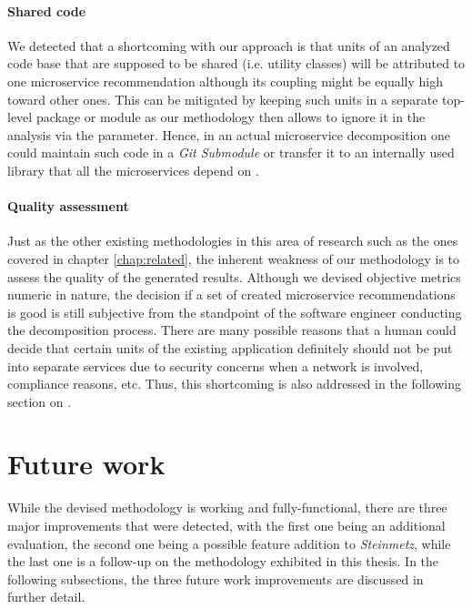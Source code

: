 \documentclass[12pt,a4paper]{report}
\begin{document}
\paragraph{Shared code}
We detected that a shortcoming with our approach is that units
of an analyzed code base that are supposed to be shared (i.e. utility classes)
will be attributed to one microservice recommendation although its coupling
might be equally high toward other ones. This can be mitigated by keeping
such units in a separate top-level package or module as our methodology then
allows to ignore it in the analysis via the  parameter.
Hence, in an actual microservice decomposition one could maintain such code in a
\textit{Git Submodule} or transfer it to an internally used library that all the
microservices depend on \cite{git-submodules}.

\paragraph{Quality assessment}
Just as the other existing methodologies in this area of research
such as the ones covered in chapter \ref{chap:related}, the inherent weakness
of our methodology is to assess the quality of the generated results.
Although we devised objective metrics numeric in nature, the decision if a set
of created microservice recommendations is good is still subjective from the
standpoint of the software engineer conducting the decomposition process.
There are many possible reasons that a human could decide that certain units
of the existing application definitely should not be put into separate services
due to security concerns when a network is involved, compliance reasons, etc.
Thus, this shortcoming is also addressed in the following section on
\textit{}.



\section{Future work} \label{sect:future-work}

While the devised methodology is working and fully-functional, there are three
major improvements that were detected, with the first one being an additional
evaluation, the second one being a possible feature addition to \textit{Steinmetz},
while the last one is a follow-up on the methodology exhibited in this thesis.
In the following subsections, the three future work improvements are discussed in
further detail.
\end{document}
